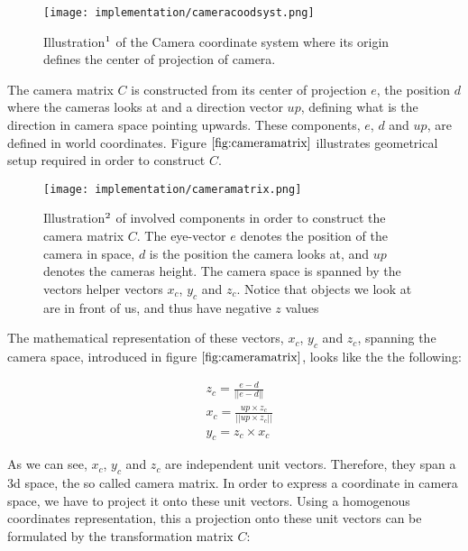 \begin{figure}[H]
  \centering
  \texttt{[image: implementation/cameracoodsyst.png]}
  \caption[Camera Coordinate System]{Illustration$\footnotemark$ of the Camera coordinate system where its origin defines the center of projection of camera.}
  \label{fig:cameracoordinatesystem}
\end{figure}

The camera matrix $C$ is constructed from its center of projection $e$, the position $d$ where the cameras looks at and a direction vector $up$, defining what is the direction in camera space pointing upwards. These components, $e$, $d$ and $up$, are defined in world coordinates. Figure $\ref{fig:cameramatrix}$ illustrates geometrical setup required in order to construct $C$.

\begin{figure}[H]
  \centering
  \texttt{[image: implementation/cameramatrix.png]}
  \caption[Camera Matrix]{Illustration$\footnotemark$ of involved components in order to construct the camera matrix $C$. The eye-vector $e$ denotes the position of the camera in space, $d$ is the position the camera looks at, and $up$ denotes the cameras height. The camera space is spanned by the vectors helper vectors $x_c$, $y_c$ and $z_c$. Notice that objects we look at are in front of us, and thus have negative $z$ values}
  \label{fig:cameramatrix}
\end{figure}

The mathematical representation of these vectors, $x_c$, $y_c$ and $z_c$, spanning the camera space, introduced in figure $\ref{fig:cameramatrix}$, looks like the the following: 

\begin{align}
  &z_c = \frac{e-d}{||e-d||} \nonumber \\
  &x_c = \frac{up \times z_c}{||up \times z_c||} \nonumber \\
  &y_c = z_c \times x_c
  \label{eq:cameraspacespanningvectors}
\end{align}

As we can see, $x_c$, $y_c$ and $z_c$ are independent unit vectors. Therefore, they span a 3d space, the so called camera matrix. In order to express a coordinate in camera space, we have to project it onto these unit vectors. Using a homogenous coordinates representation, this a projection onto these unit vectors can be formulated by the transformation matrix $C$:

